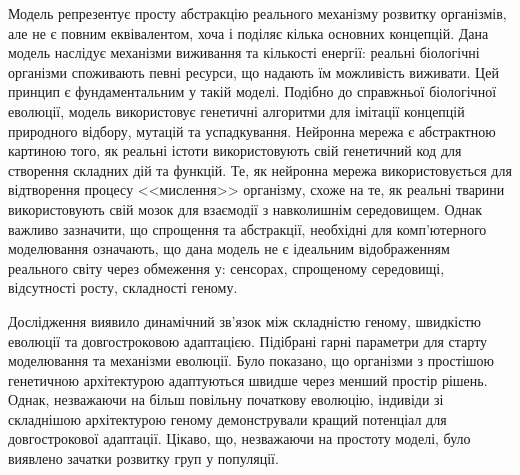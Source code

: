 \chapconclude{\ref{chap:practice}}



Модель репрезентує просту абстракцію реального механізму розвитку організмів,
але не є повним еквівалентом, хоча і поділяє кілька основних концепцій.
Дана модель наслідує механізми виживання та кількості енергії:
реальні біологічні організми споживають певні ресурси, що надають їм можливість
виживати. Цей принцип є фундаментальним у такій моделі.
Подібно до справжньої біологічної еволюції, 
модель використовує генетичні алгоритми для імітації концепцій 
природного відбору, мутацій та успадкування. 
Нейронна мережа є абстрактною картиною того,
як реальні істоти використовують свій генетичний код
для створення складних дій та функцій.
Те, як нейронна мережа використовується
для відтворення процесу <<мислення>> організму,
схоже на те, як реальні тварини використовують
свій мозок для взаємодії з навколишнім середовищем.
Однак важливо зазначити, що спрощення та абстракції, 
необхідні для комп'ютерного моделювання означають, 
що дана модель не є ідеальним відображенням реального світу
через обмеження у: сенсорах, спрощеному середовищі,
відсутності росту, складності геному.


Дослідження виявило динамічний зв'язок між складністю геному, 
швидкістю еволюції та довгостроковою адаптацією. 
Підібрані гарні параметри для старту моделювання та механізми
еволюції.
Було показано, що організми з простішою генетичною архітектурою адаптуються 
швидше через менший простір рішень. 
Однак, незважаючи на більш повільну початкову еволюцію, 
індивіди зі складнішою архітектурою геному демонстрували кращий потенціал 
для довгострокової адаптації.
Цікаво, що, незважаючи на простоту моделі, було виявлено
зачатки розвитку груп у популяції. 



